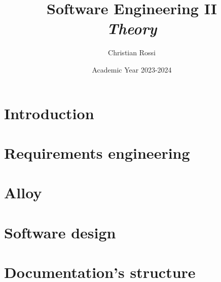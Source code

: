 \documentclass[12pt, a4paper]{report}
\title{Software Engineering II \\ \textit{Theory}}
\author{Christian Rossi}
\date{Academic Year 2023-2024}
\begin{document}
    \maketitle

    

    \cleardoublepage
    
    \tableofcontents

    \cleardoublepage

    \chapter{Introduction}
    
    
    
       

    \chapter{Requirements engineering}
    
    
    
      
    
    
    
     
     

    \chapter{Alloy}
    
    
    
    

    \chapter{Software design}
    
    
    
    
    

    \chapter{Documentation's structure}
    
    
    
\end{document}

